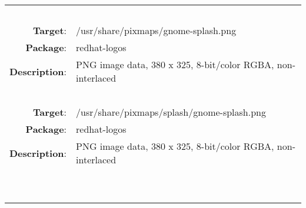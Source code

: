 \begin{longtable}{rl}
\hline
\multicolumn{2}{l}{\ }\\
\textbf{Target}: & /usr/share/pixmaps/gnome-splash.png\\
\textbf{Package}: & redhat-logos\\
\textbf{Description}: & PNG image data, 380 x 325, 8-bit/color RGBA, non-interlaced\\
\multicolumn{2}{l}{\ }\\
\textbf{Target}: & /usr/share/pixmaps/splash/gnome-splash.png\\
\textbf{Package}: & redhat-logos\\
\textbf{Description}: & PNG image data, 380 x 325, 8-bit/color RGBA, non-interlaced\\
\multicolumn{2}{l}{\ }\\
\hline
\multicolumn{2}{l}{\ }\\
\end{longtable}
